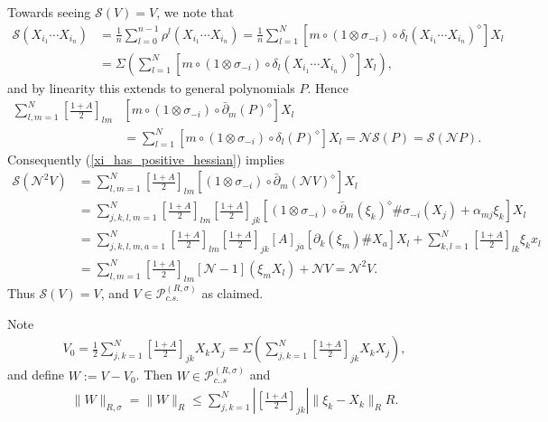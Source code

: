 Towards seeing $\mathscr{S}(V)=V$, we note that
	\begin{align*}
		\mathscr{S}(X_{i_1}\cdots X_{i_n}) &= \frac{1}{n}\sum_{l=0}^{n-1} \rho^l(X_{i_1}\cdots X_{i_n}) = \frac{1}{n}\sum_{l=1}^N \left[m\circ(1\otimes\sigma_{-i})\circ\delta_l(X_{i_1}\cdots X_{i_n})^\diamond\right]X_l\\
			&=\Sigma\left(\sum_{l=1}^N \left[m\circ(1\otimes\sigma_{-i})\circ\delta_l(X_{i_1}\cdots X_{i_n})^\diamond\right]X_l\right),
	\end{align*}
and by linearity this extends to general polynomials $P$. Hence
	\begin{align*}
		\sum_{l,m=1}^N \left[\frac{1+A}{2}\right]_{lm} &\left[m\circ(1\otimes\sigma_{-i})\circ\bar{\partial}_{m}(P)^\diamond\right]X_l \\
					&= \sum_{l=1}^N \left[m\circ(1\otimes\sigma_{-i})\circ\delta_l(P)^\diamond\right] X_l = \mathscr{N}\mathscr{S}(P)=\mathscr{S}(\mathscr{N}P).
	\end{align*}
Consequently (\ref{xi_has_positive_hessian}) implies
	\begin{align*}
		\mathscr{S}(\mathscr{N}^2V) &= \sum_{l,m=1}^N \left[\frac{1+A}{2}\right]_{lm} \left[(1\otimes\sigma_{-i})\circ\bar{\partial}_m\left(\mathscr{N}V\right)^\diamond\right] X_l\\
						&=\sum_{j,k,l,m=1}^N \left[\frac{1+A}{2}\right]_{lm}\left[\frac{1+A}{2}\right]_{jk} \left[ (1\otimes\sigma_{-i})\circ\bar{\partial}_m(\xi_k)^\diamond\# \sigma_{-i}(X_j) + \alpha_{mj}\xi_k\right]X_l\\
						&=\sum_{j,k,l,m,a=1}^N \left[\frac{1+A}{2}\right]_{lm}\left[\frac{1+A}{2}\right]_{jk} [A]_{ja}\left[ \partial_k(\xi_m)\# X_a\right]X_l + \sum_{k,l=1}^N \left[\frac{1+A}{2}\right]_{lk} \xi_k x_l\\
						&=\sum_{l,m=1}^N \left[\frac{1+A}{2}\right]_{lm} \left[\mathscr{N}-1\right]\left(\xi_m X_l\right) + \mathscr{N}V=\mathscr{N}^2V.
	\end{align*}
Thus $\mathscr{S}(V)=V$, and $V\in\mathscr{P}_{c.s.}^{(R,\sigma)}$ as claimed.\par
Note
	\begin{align*}
		V_0=\frac{1}{2}\sum_{j,k=1}^N \left[\frac{1+A}{2}\right]_{jk} X_kX_j = \Sigma\left(\sum_{j,k=1}^N \left[\frac{1+A}{2}\right]_{jk} X_kX_j\right),
	\end{align*}
and define $W:=V-V_0$. Then $W\in\mathscr{P}_{c..s}^{(R,\sigma)}$ and
	\begin{align*}
		\|W\|_{R,\sigma}=\|W\|_{R} \leq \sum_{j,k=1}^N \left|\left[\frac{1+A}{2}\right]_{jk}\right| \|\xi_k - X_k\|_{R} R.
	\end{align*}
